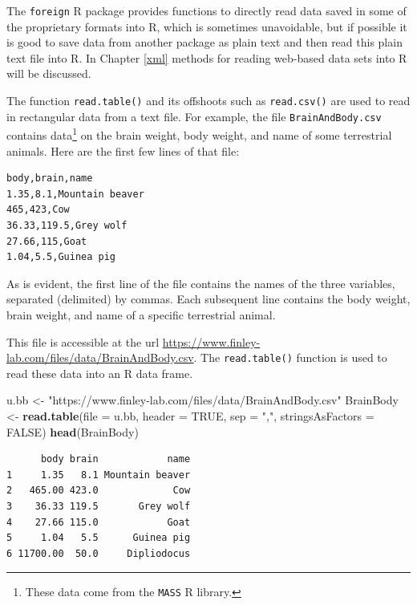 \documentclass[
]{krantz}
\makeatletter
\newenvironment{Shaded}{\begin{snugshade}}{\end{snugshade}}
\newcommand{\DataTypeTok}[1]{\textcolor[rgb]{0.27,0.27,0.27}{#1}}
\newcommand{\KeywordTok}[1]{\textcolor[rgb]{0.27,0.27,0.27}{\textbf{#1}}}
\newcommand{\NormalTok}[1]{#1}
\newcommand{\OtherTok}[1]{\textcolor[rgb]{0.37,0.37,0.37}{#1}}
\newcommand{\StringTok}[1]{\textcolor[rgb]{0.5,0.5,0.5}{#1}}
\newenvironment{kframe}{%
\medskip{}
\setlength{\fboxsep}{.8em}
 \def\at@end@of@kframe{}%
 \ifinner\ifhmode%
  \def\at@end@of@kframe{\end{minipage}}%
  \begin{minipage}{\columnwidth}%
 \fi\fi%
 \def\FrameCommand##1{\hskip\@totalleftmargin \hskip-\fboxsep
 \colorbox{shadecolor}{##1}\hskip-\fboxsep
     \hskip-\linewidth \hskip-\@totalleftmargin \hskip\columnwidth}%
 \MakeFramed {\advance\hsize-\width
   \@totalleftmargin\z@ \linewidth\hsize
   \@setminipage}}%
 {\par\unskip\endMakeFramed%
 \at@end@of@kframe}
\renewenvironment{Shaded}{\begin{kframe}}{\end{kframe}}
\makeatother
\begin{document}
The \texttt{foreign} R package provides functions to directly read data saved in some of the proprietary formats into R, which is sometimes unavoidable, but if possible it is good to save data from another package as plain text and then read this plain text file into R. In Chapter \ref{xml} methods for reading web-based data sets into R will be discussed.

The function \texttt{read.table()} and its offshoots such as \texttt{read.csv()} are used to read in rectangular data from a text file. For example, the file \texttt{BrainAndBody.csv} contains data\footnote{These data come from the \texttt{MASS} R library.} on the brain weight, body weight, and name of some terrestrial animals. Here are the first few lines of that file:

\begin{verbatim}
body,brain,name
1.35,8.1,Mountain beaver
465,423,Cow
36.33,119.5,Grey wolf
27.66,115,Goat
1.04,5.5,Guinea pig
\end{verbatim}

As is evident, the first line of the file contains the names of the three variables, separated (delimited) by commas. Each subsequent line contains the body weight, brain weight, and name of a specific terrestrial animal.

This file is accessible at the url \url{https://www.finley-lab.com/files/data/BrainAndBody.csv}. The \texttt{read.table()} function is used to read these data into an R data frame.

\begin{Shaded}
\begin{Highlighting}[]
\NormalTok{u.bb \textless{}{-}}\StringTok{ "https://www.finley{-}lab.com/files/data/BrainAndBody.csv"}
\NormalTok{BrainBody \textless{}{-}}\StringTok{ }\KeywordTok{read.table}\NormalTok{(}\DataTypeTok{file =}\NormalTok{ u.bb, }\DataTypeTok{header =} \OtherTok{TRUE}\NormalTok{, }\DataTypeTok{sep =} \StringTok{","}\NormalTok{, }
                        \DataTypeTok{stringsAsFactors =} \OtherTok{FALSE}\NormalTok{)}
\KeywordTok{head}\NormalTok{(BrainBody)}
\end{Highlighting}
\end{Shaded}

\begin{verbatim}
      body brain            name
1     1.35   8.1 Mountain beaver
2   465.00 423.0             Cow
3    36.33 119.5       Grey wolf
4    27.66 115.0            Goat
5     1.04   5.5      Guinea pig
6 11700.00  50.0     Dipliodocus
\end{verbatim}
\end{document}
